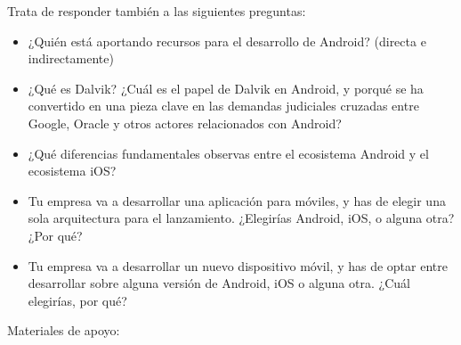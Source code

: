 \documentclass[a4paper,12pt]{article}
\begin{document}
Trata de responder también a las siguientes preguntas:

\begin{itemize}
\item ¿Quién está aportando recursos para el desarrollo de Android? (directa e indirectamente)
\item ¿Qué es Dalvik? ¿Cuál es el papel de Dalvik en Android, y porqué se ha convertido en una pieza clave en las demandas judiciales cruzadas entre Google, Oracle y otros actores relacionados con Android?
\item ¿Qué diferencias fundamentales observas entre el ecosistema Android y el ecosistema iOS?
\item Tu empresa va a desarrollar una aplicación para móviles, y has de elegir una sola arquitectura para el lanzamiento. ¿Elegirías Android, iOS, o alguna otra? ¿Por qué?
\item Tu empresa va a desarrollar un nuevo dispositivo móvil, y has de optar entre desarrollar sobre alguna versión de Android, iOS o alguna otra. ¿Cuál elegirías, por qué?
\end{itemize}

Materiales de apoyo:
\end{document}
